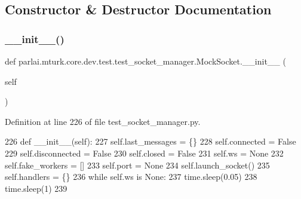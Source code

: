 \subsection{Constructor \& Destructor Documentation}
\mbox{\label{classparlai_1_1mturk_1_1core_1_1dev_1_1test_1_1test__socket__manager_1_1MockSocket_aae84c6558084a2a830cafc4f6954daec}} 
\subsubsection{\texorpdfstring{\+\_\+\+\_\+init\+\_\+\+\_\+()}{\_\_init\_\_()}}
{\footnotesize\ttfamily def parlai.\+mturk.\+core.\+dev.\+test.\+test\+\_\+socket\+\_\+manager.\+Mock\+Socket.\+\_\+\+\_\+init\+\_\+\+\_\+ (\begin{DoxyParamCaption}\item[{}]{self }\end{DoxyParamCaption})}



Definition at line 226 of file test\+\_\+socket\+\_\+manager.\+py.


\begin{DoxyCode}
226     \textcolor{keyword}{def }\_\_init\_\_(self):
227         self.last\_messages = \{\}
228         self.connected = \textcolor{keyword}{False}
229         self.disconnected = \textcolor{keyword}{False}
230         self.closed = \textcolor{keyword}{False}
231         self.ws = \textcolor{keywordtype}{None}
232         self.fake\_workers = []
233         self.port = \textcolor{keywordtype}{None}
234         self.launch\_socket()
235         self.handlers = \{\}
236         \textcolor{keywordflow}{while} self.ws \textcolor{keywordflow}{is} \textcolor{keywordtype}{None}:
237             time.sleep(0.05)
238         time.sleep(1)
239 
\end{DoxyCode}


